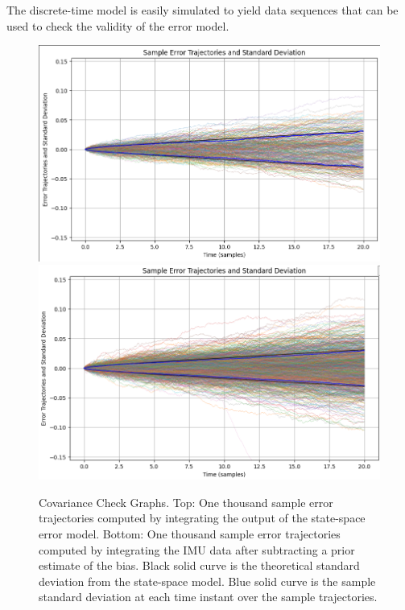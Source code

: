 \documentclass[letter,twocolumn]{article}
\begin{document}
The discrete-time model is easily simulated to yield data sequences that can be used to check the validity of the error model.


\begin{figure}[bth]
	\centering
	\includegraphics[trim=0.1in 0in 0in 0.1in, clip, width=\columnwidth]{figure/cov_sim}
	\includegraphics[trim=0in 0in 0in 0.01in, clip, width=\columnwidth]{figure/cov_instrument}
	\caption{Covariance Check Graphs. 
		Top: One thousand sample error trajectories computed by integrating the output of the state-space error model. 
		Bottom: One thousand sample error trajectories computed by integrating the IMU data after subtracting a prior estimate of the bias.
		Black solid curve is the theoretical standard deviation from the state-space model. 
		Blue solid curve is the sample standard deviation at each time instant over the sample trajectories. }
	\label{fig:cov_plot}
\end{figure}
\end{document}
